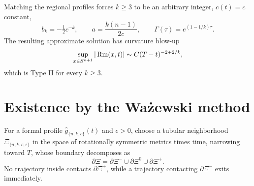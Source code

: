 \begin{proposition}
\label{prop:chow-iv-matched-parameters}
Matching the regional profiles forces $k\ge3$ to be an arbitrary integer,
$c(t)=c$ constant,
\[
 b_k=-\tfrac12c^{-k},\qquad a=\frac{k(n-1)}{2c},
 \qquad \Gamma(\tau)=e^{(1-1/k)\tau}.
\]
The resulting approximate solution has curvature blow-up
\[
 \sup_{x\in S^{n+1}}|\operatorname{Rm}(x,t)|\sim C(T-t)^{-2+2/k},
\]
which is Type II for every $k\ge3$.
\end{proposition}

\section{Existence by the Ważewski method}

\begin{definition}
\label{def:chow-iv-wazewski-tubular-neighborhood}
For a formal profile $\widehat g_{\{n,k,c\}}(t)$ and $\epsilon>0$, choose a
tubular neighborhood $\Xi_{\{n,k,c;\epsilon\}}$ in the space of rotationally
symmetric metrics times time, narrowing toward $T$, whose boundary decomposes
as
\[
 \partial\Xi=\partial\Xi^-\cup\partial\Xi^0\cup\partial\Xi^+.
\]
No trajectory inside contacts $\partial\Xi^+$, while a trajectory contacting
$\partial\Xi^-$ exits immediately.
\end{definition}


